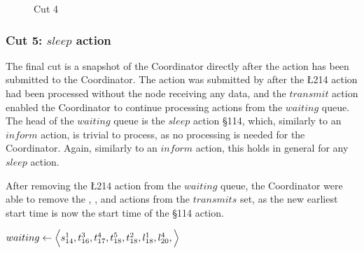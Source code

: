 \begin{figure}[H]
    \centering

    \caption{Cut 4}\label{tikz:coordinatormsc4}
\end{figure}

\subsubsection{Cut 5: $sleep$ action}
The final cut is a snapshot of the Coordinator directly after the  action has been submitted to the Coordinator. The  action was submitted by  after the \L{2}{14} action had been processed without the node receiving any data, and the $transmit$ action enabled the Coordinator to continue processing actions from the $waiting$ queue. The head of the $waiting$ queue is the $sleep$ action \S{1}{14}, which, similarly to an $inform$ action, is trivial to process, as no processing is needed for the Coordinator. Again, similarly to an $inform$ action, this holds in general for any $sleep$ action. \smallbreak

After removing the \L{2}{14} action from the $waiting$ queue, the Coordinator were able to remove the , , and  actions from the $transmits$ set, as the new earliest start time is now the start time of the \S{1}{14} action. \medbreak

$waiting \leftarrow \Big\langle%
    \S{1}{14}, %
    \T{3}{16}, %
    \T{4}{17}, %
    \T{5}{18}, %
    \T{2}{18}, %
    \L{1}{18}, %
    \L{4}{20}, %
    \Big\rangle$

